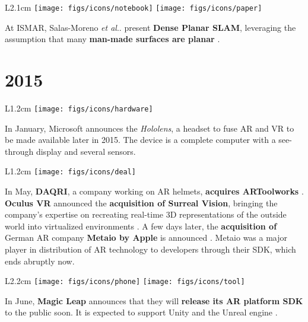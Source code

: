 \documentclass[12pt,a4paper]{article}
\makeatletter
\DeclareRobustCommand\onedot{\futurelet\@let@token\@onedot}
\def\@onedot{\ifx\@let@token.\else.\null\fi\xspace}
\def\etal{\emph{et al}\onedot}
\makeatother
\begin{document}
\vspace{0.1in}

\begin{wrapfigure}{L}{2.1cm}
	\vspace{-10pt}	
	\texttt{[image: figs/icons/notebook]}
	\texttt{[image: figs/icons/paper]}
	\vspace{-20pt}		
\end{wrapfigure} 
\noindent At ISMAR, Salas-Moreno \etal present \textbf{Dense Planar SLAM}, leveraging the assumption that many \textbf{man-made surfaces are planar} \cite{SalasMoreno14}.

\vspace{-5pt}
\section*{2015}

\begin{wrapfigure}{L}{1.2cm}
	\vspace{-15pt}	
	\texttt{[image: figs/icons/hardware]}
	\vspace{-20pt}		
\end{wrapfigure} 
In January, Microsoft announces the \emph{Hololens}, a headset to fuse AR and VR  to be made available later in 2015. The device is a complete computer with a see-through display and several sensors. 

\vspace{0.1in}

\begin{wrapfigure}{L}{1.2cm}
	\vspace{-10pt}	
	\texttt{[image: figs/icons/deal]}
	\vspace{-20pt}		
\end{wrapfigure} 
\noindent In May, \textbf{DAQRI}, a company working on AR helmets, \textbf{acquires ARToolworks} . \textbf{Oculus VR} announced the \textbf{acquisition of Surreal Vision}, bringing the company’s expertise on recreating real-time 3D representations of the outside world into virtualized environments . A few days later, the \textbf{acquisition of} German AR company \textbf{Metaio by Apple} is announced . Metaio was a major player in distribution of AR technology to developers through their SDK, which ends abruptly now. 

\vspace{0.1in}

\begin{wrapfigure}{L}{2.2cm}
	\vspace{-15pt}	
	\texttt{[image: figs/icons/phone]}
	\texttt{[image: figs/icons/tool]}
	\vspace{-20pt}		
\end{wrapfigure} 
\noindent In June, \textbf{Magic Leap} announces that they will \textbf{release its AR platform SDK} to the public soon. It is expected to support Unity and the Unreal engine .
\end{document}
